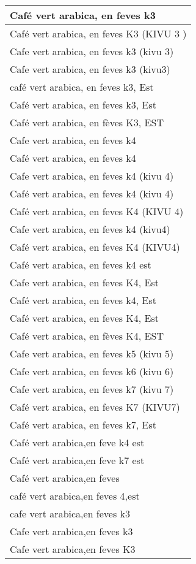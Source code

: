 \documentclass[
]{book}
\begin{document}
\begin{table}
\begin{tabular}[t]{l}
\hline
Café vert arabica, en feves k3\\
\hline
Café vert arabica, en feves K3 (KIVU 3 )\\
\hline
Cafe vert arabica, en feves k3 (kivu 3)\\
\hline
Cafe vert arabica, en feves k3 (kivu3)\\
\hline
café vert arabica, en feves k3, Est\\
\hline
Café vert arabica, en feves k3, Est\\
\hline
Café vert arabica, en fèves K3, EST\\
\hline
Cafe vert arabica, en feves k4\\
\hline
Café vert arabica, en feves k4\\
\hline
Cafe vert arabica, en feves k4 (kivu 4)\\
\hline
Café vert arabica, en feves k4 (kivu 4)\\
\hline
Café vert arabica, en feves K4 (KIVU 4)\\
\hline
Cafe vert arabica, en feves k4 (kivu4)\\
\hline
Café vert arabica, en feves K4 (KIVU4)\\
\hline
Café vert arabica, en feves k4 est\\
\hline
Cafe vert arabica, en feves K4, Est\\
\hline
Café vert arabica, en feves k4, Est\\
\hline
Café vert arabica, en feves K4, Est\\
\hline
Café vert arabica, en fèves K4, EST\\
\hline
Cafe vert arabica, en feves k5 (kivu 5)\\
\hline
Cafe vert arabica, en feves k6 (kivu 6)\\
\hline
Cafe vert arabica, en feves k7 (kivu 7)\\
\hline
Café vert arabica, en feves K7 (KIVU7)\\
\hline
Café vert arabica, en feves k7, Est\\
\hline
Café vert arabica,en feve k4 est\\
\hline
Café vert arabica,en feve k7 est\\
\hline
Café vert arabica,en feves\\
\hline
café vert arabica,en feves 4,est\\
\hline
cafe vert arabica,en feves k3\\
\hline
Cafe vert arabica,en feves k3\\
\hline
Cafe vert arabica,en feves K3\\

\end{tabular}
\end{table}
\end{document}
